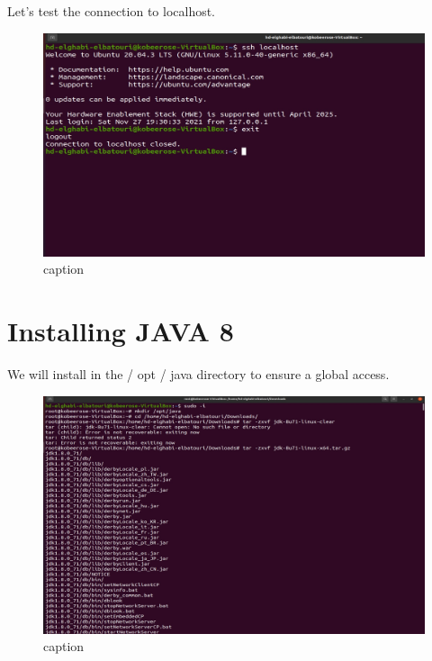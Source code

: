 \begin{spacing}{1.2}
\par Let's test the connection to localhost.
\\
\begin{figure}[!htb] 
\begin{center} 
\includegraphics[width=1\linewidth]{Big_Data/Hadoop/Apache Hadoop Installation/Connecting to localhost.jpg} 
\end{center} 
\caption{caption} 
\end{figure} 
\FloatBarrier

\section{Installing JAVA 8}

\par We will install in the / opt / java directory to ensure a global access.
\\
\begin{figure}[!htb] 
\begin{center} 
\includegraphics[width=1\linewidth]{Big_Data/Hadoop/Apache Hadoop Installation/Extracting files.jpg} 
\end{center} 
\caption{caption} 
\end{figure} 
\FloatBarrier


\end{spacing}
